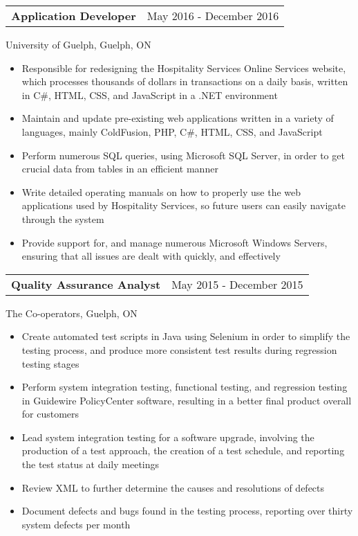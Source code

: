 \documentclass[12pt]{article}
\newcommand{\doublespace}{\vspace{8pt}}
\begin{document}
\doublespace

{
  \small
  \noindent\begin{tabu} {@{} X[l] X[r]}
    \textbf{Application Developer} & May 2016 - December 2016
  \end{tabu}
  University of Guelph, Guelph, ON
  \begin{itemize}
    \item Responsible for redesigning the Hospitality Services Online Services website, which processes thousands of dollars in transactions on a daily basis, written in C\#, HTML, CSS, and JavaScript in a .NET environment
    \item Maintain and update pre-existing web applications written in a variety of languages, mainly ColdFusion, PHP, C\#, HTML, CSS, and JavaScript
    \item Perform numerous SQL queries, using Microsoft SQL Server, in order to get crucial data from tables in an efficient manner
    \item Write detailed operating manuals on how to properly use the web applications used by Hospitality Services, so future users can easily navigate through the system
    \item Provide support for, and manage numerous Microsoft Windows Servers, ensuring that all issues are dealt with quickly, and effectively
  \end{itemize}
}

\doublespace

{
  \small
  \noindent\begin{tabu} {@{} X[l] X[r]}
    \textbf{Quality Assurance Analyst} & May 2015 - December 2015
  \end{tabu}
  The Co-operators, Guelph, ON
  \begin{itemize}
    \item Create automated test scripts in Java using Selenium in order to simplify the testing process, and produce more consistent test results during regression testing stages
    \item Perform system integration testing, functional testing, and regression testing in Guidewire PolicyCenter software, resulting in a better final product overall for customers
    \item Lead system integration testing for a software upgrade, involving the production of a test approach, the creation of a test schedule, and reporting the test status at daily meetings
    \item Review XML to further determine the causes and resolutions of defects
    \item Document defects and bugs found in the testing process, reporting over thirty system defects per month
  \end{itemize}
}
\end{document}
